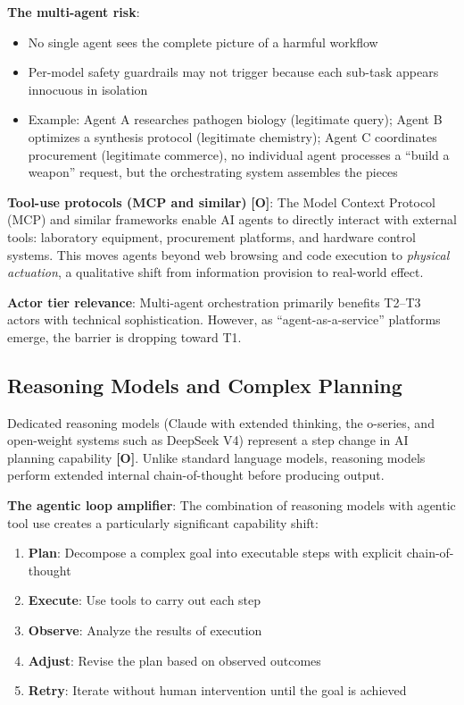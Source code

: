 \documentclass[11pt,letterpaper]{article}
\begin{document}
\textbf{The multi-agent risk}:
\begin{itemize}[nosep]
  \item No single agent sees the complete picture of a harmful workflow
  \item Per-model safety guardrails may not trigger because each sub-task appears innocuous in isolation
  \item Example: Agent A researches pathogen biology (legitimate query); Agent B optimizes a synthesis protocol (legitimate chemistry); Agent C coordinates procurement (legitimate commerce), no individual agent processes a ``build a weapon'' request, but the orchestrating system assembles the pieces
\end{itemize}

\textbf{Tool-use protocols (MCP and similar)} \textbf{[O]}: The Model Context Protocol (MCP) and similar frameworks enable AI agents to directly interact with external tools: laboratory equipment, procurement platforms, and hardware control systems. This moves agents beyond web browsing and code execution to \textit{physical actuation}, a qualitative shift from information provision to real-world effect.

\textbf{Actor tier relevance}: Multi-agent orchestration primarily benefits T2--T3 actors with technical sophistication. However, as ``agent-as-a-service'' platforms emerge, the barrier is dropping toward T1.

\subsection{Reasoning Models and Complex Planning}

Dedicated reasoning models (Claude with extended thinking, the o-series, and open-weight systems such as DeepSeek V4) represent a step change in AI planning capability \textbf{[O]}. Unlike standard language models, reasoning models perform extended internal chain-of-thought before producing output.

\textbf{The agentic loop amplifier}: The combination of reasoning models with agentic tool use creates a particularly significant capability shift:
\begin{enumerate}[nosep]
  \item \textbf{Plan}: Decompose a complex goal into executable steps with explicit chain-of-thought
  \item \textbf{Execute}: Use tools to carry out each step
  \item \textbf{Observe}: Analyze the results of execution
  \item \textbf{Adjust}: Revise the plan based on observed outcomes
  \item \textbf{Retry}: Iterate without human intervention until the goal is achieved
\end{enumerate}
\end{document}
